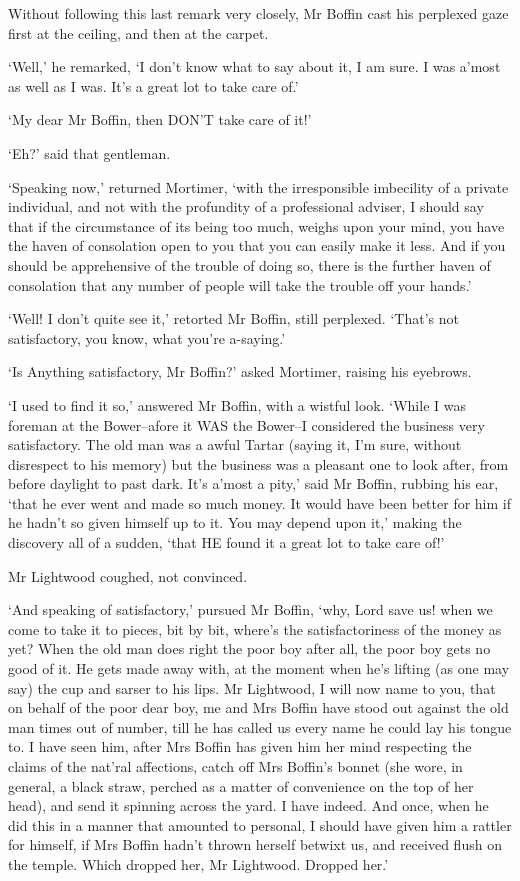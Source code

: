 Without following this last remark very closely, Mr Boffin cast his
perplexed gaze first at the ceiling, and then at the carpet.

‘Well,’ he remarked, ‘I don’t know what to say about it, I am sure. I
was a’most as well as I was. It’s a great lot to take care of.’

‘My dear Mr Boffin, then DON’T take care of it!’

‘Eh?’ said that gentleman.

‘Speaking now,’ returned Mortimer, ‘with the irresponsible imbecility
of a private individual, and not with the profundity of a professional
adviser, I should say that if the circumstance of its being too much,
weighs upon your mind, you have the haven of consolation open to you
that you can easily make it less. And if you should be apprehensive of
the trouble of doing so, there is the further haven of consolation that
any number of people will take the trouble off your hands.’

‘Well! I don’t quite see it,’ retorted Mr Boffin, still perplexed.
‘That’s not satisfactory, you know, what you’re a-saying.’

‘Is Anything satisfactory, Mr Boffin?’ asked Mortimer, raising his
eyebrows.

‘I used to find it so,’ answered Mr Boffin, with a wistful look. ‘While
I was foreman at the Bower--afore it WAS the Bower--I considered the
business very satisfactory. The old man was a awful Tartar (saying
it, I’m sure, without disrespect to his memory) but the business was
a pleasant one to look after, from before daylight to past dark. It’s
a’most a pity,’ said Mr Boffin, rubbing his ear, ‘that he ever went and
made so much money. It would have been better for him if he hadn’t so
given himself up to it. You may depend upon it,’ making the discovery
all of a sudden, ‘that HE found it a great lot to take care of!’

Mr Lightwood coughed, not convinced.

‘And speaking of satisfactory,’ pursued Mr Boffin, ‘why, Lord save
us! when we come to take it to pieces, bit by bit, where’s the
satisfactoriness of the money as yet? When the old man does right the
poor boy after all, the poor boy gets no good of it. He gets made away
with, at the moment when he’s lifting (as one may say) the cup and
sarser to his lips. Mr Lightwood, I will now name to you, that on behalf
of the poor dear boy, me and Mrs Boffin have stood out against the old
man times out of number, till he has called us every name he could lay
his tongue to. I have seen him, after Mrs Boffin has given him her mind
respecting the claims of the nat’ral affections, catch off Mrs Boffin’s
bonnet (she wore, in general, a black straw, perched as a matter of
convenience on the top of her head), and send it spinning across
the yard. I have indeed. And once, when he did this in a manner that
amounted to personal, I should have given him a rattler for himself, if
Mrs Boffin hadn’t thrown herself betwixt us, and received flush on the
temple. Which dropped her, Mr Lightwood. Dropped her.’

